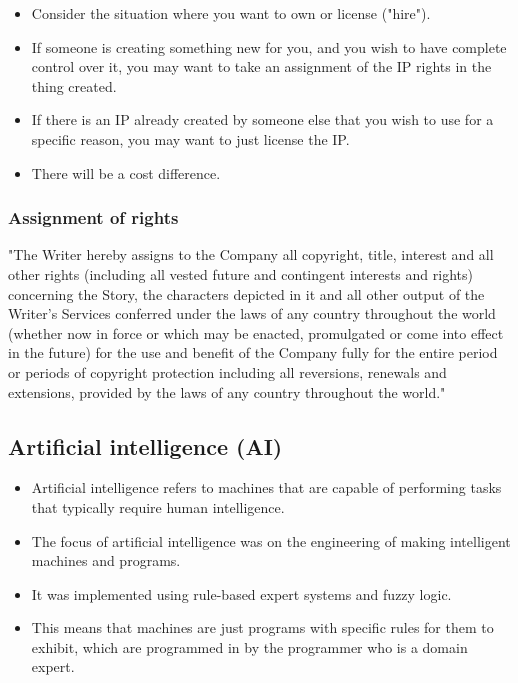 \documentclass[11pt]{article}
\begin{document}
\begin{itemize}
\item Consider the situation where you want to own or license ("hire").
\item If someone is creating something new for you, and you wish to have complete control over it, you may want to take an assignment of the IP rights in the thing created.
\item If there is an IP already created by someone else that you wish to use for a specific reason, you may want to just license the IP.
\item There will be a cost difference.
\end{itemize}

 \newpage

\subsubsection{Assignment of rights}
\label{sec:org6ddf071}
"The Writer hereby assigns to the Company all copyright, title, interest and all other rights (including all vested future and contingent interests and rights) concerning the Story, the characters depicted in it and all other output of the Writer's Services conferred under the laws of any country throughout the world (whether now in force or which may be enacted, promulgated or come into effect in the future) for the use and benefit of the Company fully for the entire period or periods of copyright protection including all reversions, renewals and extensions, provided by the laws of any country throughout the world."

\subsection{Artificial intelligence (AI)}
\label{sec:org556f318}
\begin{itemize}
\item Artificial intelligence refers to machines that are capable of performing tasks that typically require human intelligence.
\item The focus of artificial intelligence was on the engineering of making intelligent machines and programs.
\item It was implemented using rule-based expert systems and fuzzy logic.
\item This means that machines are just programs with specific rules for them to exhibit, which are programmed in by the programmer who is a domain expert.
\end{itemize}
\end{document}
